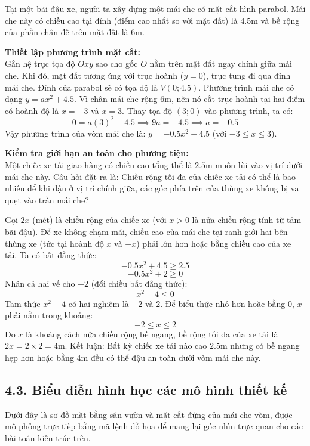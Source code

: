 \documentclass[14pt, a4paper, oneside]{extreport}
\begin{document}
Tại một bãi đậu xe, người ta xây dựng một mái che có mặt cắt hình parabol. Mái che này có chiều cao tại đỉnh (điểm cao nhất so với mặt đất) là $4.5\text{m}$ và bề rộng của phần chân đế trên mặt đất là $6\text{m}$. 

\textbf{Thiết lập phương trình mặt cắt:} \\
Gắn hệ trục tọa độ $Oxy$ sao cho gốc $O$ nằm trên mặt đất ngay chính giữa mái che. Khi đó, mặt đất tương ứng với trục hoành ($y = 0$), trục tung đi qua đỉnh mái che. Đỉnh của parabol sẽ có tọa độ là $V(0; 4.5)$. Phương trình mái che có dạng $y = ax^2 + 4.5$.
Vì chân mái che rộng $6\text{m}$, nên nó cắt trục hoành tại hai điểm có hoành độ là $x = -3$ và $x = 3$. Thay tọa độ $(3; 0)$ vào phương trình, ta có:
\[ 0 = a(3)^2 + 4.5 \implies 9a = -4.5 \implies a = -0.5 \]
Vậy phương trình của vòm mái che là: $y = -0.5x^2 + 4.5$ (với $-3 \le x \le 3$).

\textbf{Kiểm tra giới hạn an toàn cho phương tiện:} \\
Một chiếc xe tải giao hàng có chiều cao tổng thể là $2.5\text{m}$ muốn lùi vào vị trí dưới mái che này. Câu hỏi đặt ra là: Chiều rộng tối đa của chiếc xe tải có thể là bao nhiêu để khi đậu ở vị trí chính giữa, các góc phía trên của thùng xe không bị va quẹt vào trần mái che?

Gọi $2x$ (mét) là chiều rộng của chiếc xe (với $x > 0$ là nửa chiều rộng tính từ tâm bãi đậu). Để xe không chạm mái, chiều cao của mái che tại ranh giới hai bên thùng xe (tức tại hoành độ $x$ và $-x$) phải lớn hơn hoặc bằng chiều cao của xe tải. Ta có bất đẳng thức:
\[ -0.5x^2 + 4.5 \ge 2.5 \]
\[ -0.5x^2 + 2 \ge 0 \]
Nhân cả hai vế cho $-2$ (đổi chiều bất đẳng thức):
\[ x^2 - 4 \le 0 \]
Tam thức $x^2 - 4$ có hai nghiệm là $-2$ và $2$. Để biểu thức nhỏ hơn hoặc bằng $0$, $x$ phải nằm trong khoảng:
\[ -2 \le x \le 2 \]
Do $x$ là khoảng cách nửa chiều rộng bề ngang, bề rộng tối đa của xe tải là $2x = 2 \times 2 = 4\text{m}$.
Kết luận: Bất kỳ chiếc xe tải nào cao $2.5\text{m}$ nhưng có bề ngang hẹp hơn hoặc bằng $4\text{m}$ đều có thể đậu an toàn dưới vòm mái che này. 

\subsection*{4.3. Biểu diễn hình học các mô hình thiết kế}

Dưới đây là sơ đồ mặt bằng sân vườn và mặt cắt đứng của mái che vòm, được mô phỏng trực tiếp bằng mã lệnh đồ họa để mang lại góc nhìn trực quan cho các bài toán kiến trúc trên.
\end{document}

